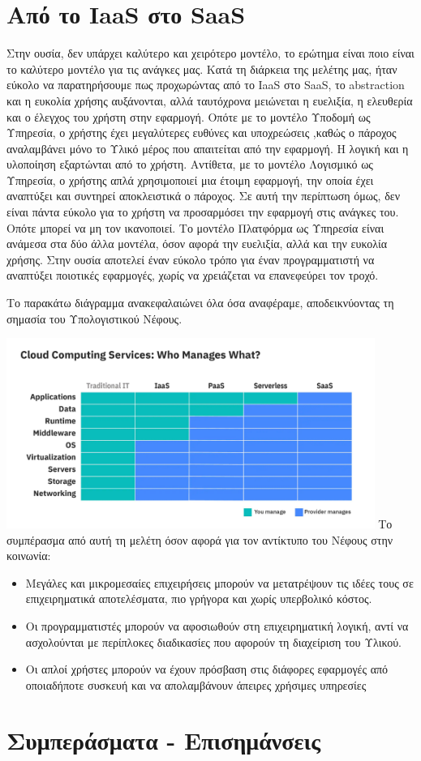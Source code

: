 \documentclass{article}
\begin{document}
\section{Από το IaaS στο
SaaS}
Στην ουσία, δεν υπάρχει καλύτερο και χειρότερο μοντέλο, το ερώτημα είναι
ποιο είναι το καλύτερο μοντέλο για τις ανάγκες μας. Κατά τη διάρκεια της
μελέτης μας, ήταν εύκολο να παρατηρήσουμε πως προχωρώντας από το
IaaS στο
SaaS, το
abstraction και η ευκολία
χρήσης αυξάνονται, αλλά ταυτόχρονα μειώνεται η ευελιξία, η ελευθερία και ο
έλεγχος του χρήστη στην εφαρμογή. Οπότε με το μοντέλο Υποδομή ως Υπηρεσία,
ο χρήστης έχει μεγαλύτερες ευθύνες και υποχρεώσεις ,καθώς ο πάροχος
αναλαμβάνει μόνο το Υλικό μέρος που απαιτείται από την εφαρμογή. Η λογική
και η υλοποίηση εξαρτώνται από το χρήστη. Αντίθετα, με το μοντέλο
Λογισμικό ως Υπηρεσία, ο χρήστης απλά χρησιμοποιεί μια έτοιμη εφαρμογή,
την οποία έχει αναπτύξει και συντηρεί αποκλειστικά ο πάροχος. Σε αυτή την
περίπτωση όμως, δεν είναι πάντα εύκολο για το χρήστη να προσαρμόσει την
εφαρμογή στις ανάγκες του. Οπότε μπορεί να μη τον ικανοποιεί. Το μοντέλο
Πλατφόρμα ως Υπηρεσία είναι ανάμεσα στα δύο άλλα μοντέλα, όσον αφορά την
ευελιξία, αλλά και την ευκολία χρήσης. Στην ουσία αποτελεί έναν εύκολο
τρόπο για έναν προγραμματιστή να αναπτύξει ποιοτικές εφαρμογές, χωρίς να
χρειάζεται να επανεφεύρει τον τροχό.

Το παρακάτω διάγραμμα ανακεφαλαιώνει όλα όσα αναφέραμε, αποδεικνύοντας τη
σημασία του Υπολογιστικού Νέφους.


\includegraphics[width=120mm]{ibm.jpg}
Το συμπέρασμα από αυτή τη μελέτη όσον αφορά για τον αντίκτυπο του Νέφους
στην κοινωνία:
\begin{itemize}
\item Μεγάλες και μικρομεσαίες επιχειρήσεις μπορούν να μετατρέψουν τις
ιδέες τους σε επιχειρηματικά αποτελέσματα, πιο γρήγορα και χωρίς
υπερβολικό κόστος.
\item Οι προγραμματιστές μπορούν να αφοσιωθούν στη επιχειρηματική λογική,
αντί να ασχολούνται με περίπλοκες διαδικασίες που αφορούν τη διαχείριση
του Υλικού.
\item        Οι απλοί χρήστες μπορούν να έχουν πρόσβαση στις διάφορες εφαρμογές
από οποιαδήποτε συσκευή και να απολαμβάνουν άπειρες χρήσιμες υπηρεσίες
\end{itemize}

\section{Συμπεράσματα - Επισημάνσεις}
\end{document}
